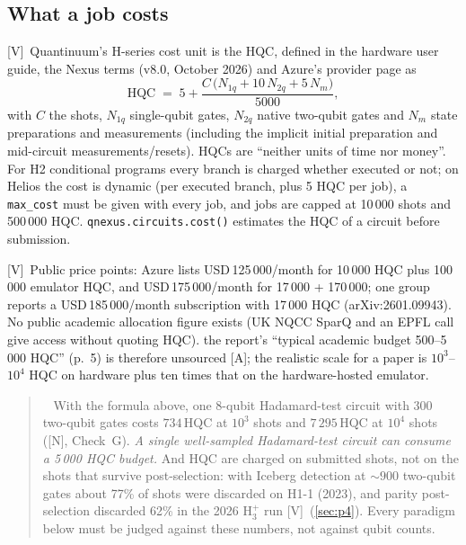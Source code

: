 \documentclass[11pt,a4paper]{article}
\newcommand{\HQC}{\mathrm{HQC}}
\newcommand{\report}{the report}
\newcommand{\lV}{\textcolor{keyblue}{[V]}}   %
\newcommand{\lA}{\textcolor{notegray}{[A]}}  %
\newcommand{\lN}{\textcolor{keyblue}{[N]}}   %
\newenvironment{idea}[1][Main idea]{\par\smallskip\begin{quotation}\noindent{\bfseries\textcolor{keyblue}{#1.}}\ }{\end{quotation}\smallskip}
\begin{document}
\subsection{What a job costs}
\lV\ Quantinuum's H-series cost unit is the HQC, defined in the hardware user guide, the Nexus terms (v8.0, October 2026) and Azure's provider page as
\[
\HQC \;=\; 5 + \frac{C\,\big(N_{1q} + 10\,N_{2q} + 5\,N_m\big)}{5000},
\]
with $C$ the shots, $N_{1q}$ single-qubit gates, $N_{2q}$ native two-qubit gates and $N_m$ state preparations and measurements (including the implicit initial preparation and mid-circuit measurements/resets). HQCs are ``neither units of time nor money''. For H2 conditional programs every branch is charged whether executed or not; on Helios the cost is dynamic (per executed branch, plus 5 HQC per job), a \texttt{max\_cost} must be given with every job, and jobs are capped at 10\,000 shots and 500\,000 HQC. \texttt{qnexus.circuits.cost()} estimates the HQC of a circuit before submission.

\lV\ Public price points: Azure lists USD\,125\,000/month for 10\,000 HQC plus 100\,000 emulator HQC, and USD\,175\,000/month for 17\,000 + 170\,000; one group reports a USD\,185\,000/month subscription with 17\,000 HQC (arXiv:2601.09943). No public academic allocation figure exists (UK NQCC SparQ and an EPFL call give access without quoting HQC). \report's ``typical academic budget 500--5\,000 HQC'' (p.~5) is therefore unsourced \lA; the realistic scale for a paper is $10^3$--$10^4$ HQC on hardware plus ten times that on the hardware-hosted emulator.

\begin{idea}[What the budget really is]
With the formula above, one 8-qubit Hadamard-test circuit with 300 two-qubit gates costs $734\,\HQC$ at $10^3$ shots and $7\,295\,\HQC$ at $10^4$ shots (\lN, Check~G). \emph{A single well-sampled Hadamard-test circuit can consume a 5\,000 HQC budget.} And HQC are charged on submitted shots, not on the shots that survive post-selection: with Iceberg detection at $\sim900$ two-qubit gates about 77\% of shots were discarded on H1-1 (2023), and parity post-selection discarded 62\% in the 2026 H$_3^+$ run \lV\ (\cref{sec:p4}). Every paradigm below must be judged against these numbers, not against qubit counts.
\end{idea}
\end{document}
